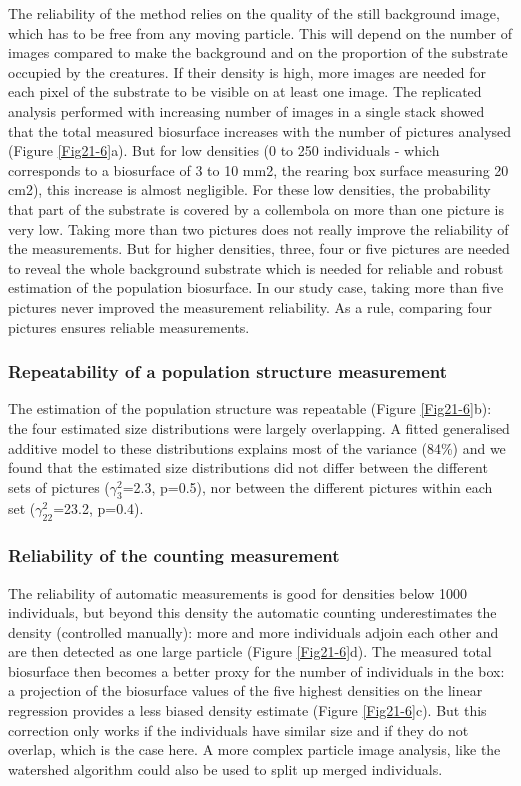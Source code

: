 The reliability of the method relies on the quality of the still background
image, which has to be free from any moving particle. This will depend on the
number of images compared to make the background and on the proportion of the
substrate occupied by the creatures. If their density is high, more images are
needed for each pixel of the substrate to be visible on at least one image. The
replicated analysis performed with increasing number of images in a single stack
showed that the total measured biosurface increases with the number of pictures
analysed (Figure \ref{Fig21-6}a). But for low densities (0 to 250 individuals - which
corresponds to a biosurface of 3 to 10 mm2, the rearing box surface measuring 20
cm2), this increase is almost negligible. For these low densities, the
probability that part of the substrate is covered by a collembola on more than
one picture is very low. Taking more than two pictures does not really improve
the reliability of the measurements. But for higher densities, three, four or
five pictures are needed to reveal the whole background substrate which is
needed for reliable and robust estimation of the population biosurface. In our
study case, taking more than five pictures never improved the measurement
reliability. As a rule, comparing four pictures ensures reliable measurements.

\subsubsection{Repeatability of a population structure measurement}

The estimation of the population structure was repeatable (Figure \ref{Fig21-6}b): the four
estimated size distributions were largely overlapping. A fitted generalised
additive model to these distributions explains most of the variance (84\%) and
we found that the estimated size distributions did not differ between the
different sets of pictures ($\gamma ^2_3$=2.3, p=0.5), nor between the different
pictures within each set ($\gamma^2_{22}$=23.2, p=0.4).

\subsubsection{Reliability of the counting measurement}

The reliability of automatic measurements is good for densities below 1000
individuals, but beyond this density the automatic counting underestimates the
density (controlled manually):  more and more individuals adjoin each other and
are then detected as one large particle (Figure \ref{Fig21-6}d). The measured total
biosurface then becomes a better proxy for the number of individuals in the box:
a projection of the biosurface values of the five highest densities on the
linear regression provides a less biased density estimate (Figure \ref{Fig21-6}c). But this
correction only works if the individuals have similar size and if they do not
overlap, which is the case here. A more complex particle image analysis, like
the watershed algorithm \autocite{vincent1991a} could also be used to split up
merged individuals.

